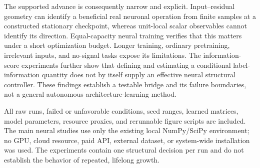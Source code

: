 The supported advance is consequently narrow and explicit. Input--residual
geometry can identify a beneficial real neuronal operation from finite samples
at a constructed stationary checkpoint, whereas unit-local scalar observables
cannot identify its direction. Equal-capacity neural training verifies that
this matters under a short optimization budget. Longer training, ordinary
pretraining, irrelevant inputs, and no-signal tasks expose its limitations.
The information-score experiments further show that defining and estimating a
conditional label-information quantity does not by itself supply an effective
neural structural controller. These findings establish a testable bridge and
its failure boundaries, not a general autonomous architecture-learning method.

All raw runs, failed or unfavorable conditions, seed ranges, learned matrices,
model parameters, resource proxies, and rerunnable figure scripts are included.
The main neural studies use only the existing local NumPy/SciPy environment;
no GPU, cloud resource, paid API, external dataset, or system-wide installation
was used. The experiments contain one structural decision per run and do not
establish the behavior of repeated, lifelong growth.
